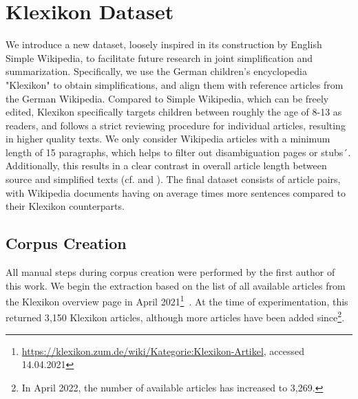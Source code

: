 \documentclass[10pt, a4paper]{article}
\begin{document}
\section{Klexikon Dataset}

We introduce a new dataset, loosely inspired in its construction by English Simple Wikipedia, to facilitate future research in joint simplification and summarization.
Specifically, we use the German children's encyclopedia "Klexikon" to obtain simplifications, and align them with reference articles from the German Wikipedia.
Compared to Simple Wikipedia, which can be freely edited, Klexikon specifically targets children between roughly the age of 8-13 as readers, and follows a strict reviewing procedure for individual articles, resulting in higher quality texts.
We only consider Wikipedia articles with a minimum length of 15 paragraphs, which helps to filter out disambiguation pages or stubs´. Additionally, this results in a clear contrast in overall article length between source and simplified texts (cf.  and ).
The final dataset consists of  article pairs, with Wikipedia documents having on average  times more sentences compared to their Klexikon counterparts.






\subsection{Corpus Creation}
All manual steps during corpus creation were performed by the first author of this work.
We begin the extraction based on the list of all available articles from the Klexikon overview page in April 2021\footnote{\url{https://klexikon.zum.de/wiki/Kategorie:Klexikon-Artikel}, accessed 14.04.2021}~. At the time of experimentation, this returned 3{,}150 Klexikon articles, although more articles have been added since\footnote{In April 2022, the number of available articles has increased to 3{,}269.}.
\end{document}

